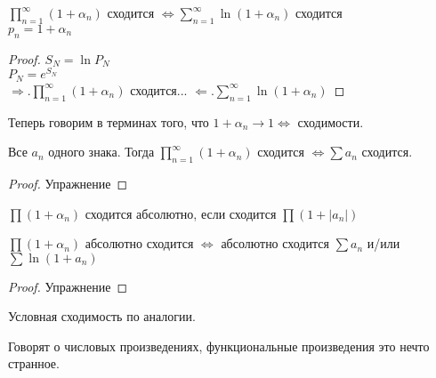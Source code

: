 \begin{Thm} 
    $\prod_{n=1}^{\infty} (1+ \alpha_n)$ сходится $\Leftrightarrow \sum_{n=1}^{\infty} \ln (1+\alpha_n)$ сходится\\
    $p_n = 1 + \alpha_n$
\end{Thm} 

\begin{proof}
    $S_N = \ln P_N$\\
    $P_N = e^{S_N}$\\
    $\Rightarrow. \prod_{n=1}^{\infty} (1+ \alpha_n)$ сходится... %
    $\Leftarrow. \sum_{n=1}^{\infty} \ln (1+\alpha_n)$ %
\end{proof}

\begin{Rem}
    Теперь говорим в терминах того, что $1+\alpha_n \to 1 \Leftrightarrow$ сходимости. 
\end{Rem}

\begin{Thm} 
    Все $a_n$ одного знака. Тогда $\prod_{n=1}^{\infty} (1+ \alpha_n)$ сходится $\Leftrightarrow \sum a_n$ сходится.  
\end{Thm} 

\begin{proof}
    Упражнение
\end{proof}

\begin{Def} 
    $\prod (1+ \alpha_n)$ сходится абсолютно, если сходится $\prod (1 + |a_n|)$
\end{Def} 

\begin{Thm}
    $\prod (1+ \alpha_n)$ абсолютно сходится $\Leftrightarrow$ абсолютно сходится $\sum a_n$ и/или $\sum \ln(1+a_n)$
\end{Thm}

\begin{proof}
    Упражнение
\end{proof}

\begin{Rem}
    Условная сходимость по аналогии. 
\end{Rem}

\begin{Rem}
    Говорят о числовых произведениях, функциональные произведения это нечто странное. 
\end{Rem}


